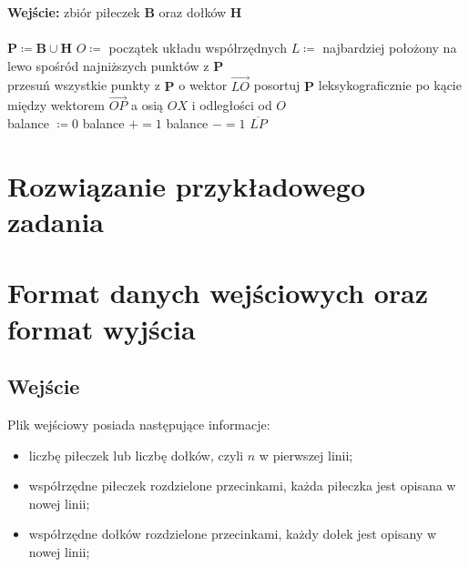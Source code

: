\documentclass[10pt,a4paper]{article}
\begin{document}
	\begin{algorithmic}
		\State \textbf{Wejście:} zbiór piłeczek $\mathbf{B}$ oraz dołków $\mathbf{H}$  \\
		
		\\
			\State $\mathbf{P} \coloneqq \mathbf{B} \cup \mathbf{H}$ 
			\State $O \coloneqq$ początek układu współrzędnych
			\State $L \coloneqq$ najbardziej położony na lewo spośród najniższych punktów z $\mathbf{P}$ 
			\\
			\State przesuń wszystkie punkty z $\mathbf{P}$ o wektor $\overrightarrow{LO}$ 
			\State posortuj $\mathbf{P}$ leksykograficznie po kącie między wektorem $\overrightarrow{OP}$ a osią $OX$ i odległości od $O$  
			\\
			\State balance $\coloneqq 0$
			  
					\State balance $\mathrel{{+}{=}} 1$
				\Else
					\State balance $\mathrel{{-}{=}} 1$
				\EndIf
					\State \Return $\overline{LP}$
				\EndIf
			\EndFor\\
		\EndFunction
	\end{algorithmic}
	
	\section{Rozwiązanie przykładowego zadania}
	
	\section{Format danych wejściowych oraz format wyjścia}
	
	\subsection{Wejście}
	
	Plik wejściowy posiada następujące informacje:
	\begin{itemize}
		\item liczbę piłeczek lub liczbę dołków, czyli $n$ w pierwszej linii;
		\item współrzędne piłeczek rozdzielone przecinkami, każda piłeczka jest opisana w nowej linii;
		\item współrzędne dołków rozdzielone przecinkami, każdy dołek jest opisany w nowej linii;
	\end{itemize}
\end{document}
